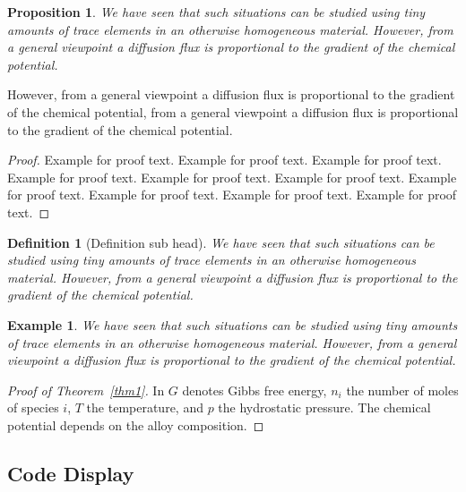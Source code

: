 \documentclass[cmbright]{WileySTAT-V1} %
\newtheorem{proposition}[theorem]{Proposition} %
\theoremstyle{plain}
\newtheorem{example}[theorem]{Example} %
\newtheorem{definition}[theorem]{Definition} %
\begin{document}
\begin{proposition}\label{prop1}
We have seen that such situations can be studied using tiny amounts of trace elements in an otherwise homogeneous material. However, from a general viewpoint a diffusion flux is proportional to the gradient of the chemical potential.
\end{proposition}

However, from a general viewpoint a diffusion flux is proportional to the gradient of the chemical potential, from a general viewpoint a diffusion flux is proportional to the gradient of the chemical potential.

\begin{proof}
Example for proof text. Example for proof text. Example for proof text. Example for proof text. Example for proof text. Example for proof text. Example for proof text. Example for proof text. Example for proof text. Example for proof text.
\end{proof}

\begin{definition}[Definition sub head]\label{def1}
We have seen that such situations can be studied using tiny amounts of trace elements in an otherwise homogeneous material. However, from a general viewpoint a diffusion flux is proportional to the gradient of the chemical potential.
\end{definition}

\begin{example}
We have seen that such situations can be studied using tiny amounts of trace elements in an otherwise homogeneous material. However, from a general viewpoint a diffusion flux is proportional to the gradient of the chemical potential.
\end{example}

\begin{proof}[Proof of Theorem~\ref{thm1}]
In $G$ denotes Gibbs free energy, $n_{i}$ the number of moles of species $i$, $T$ the temperature, and $p$ the hydrostatic pressure. The chemical potential depends on the alloy composition.
\end{proof}


\subsection{Code Display}\label{sec4.8}
\end{document}
